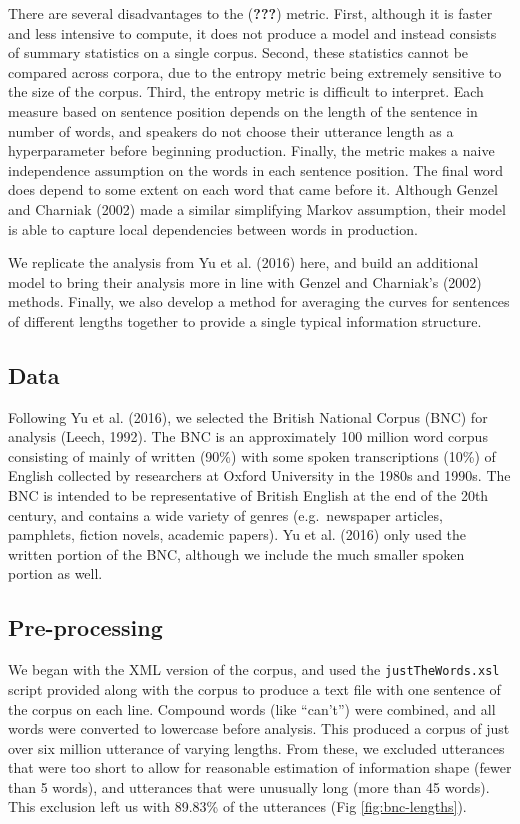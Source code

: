 \documentclass[
  english,
  man,floatsintext]{apa6}
\begin{document}
There are several disadvantages to the ({\textbf{???}}) metric. First, although it is faster and less intensive to compute, it does not produce a model and instead consists of summary statistics on a single corpus. Second, these statistics cannot be compared across corpora, due to the entropy metric being extremely sensitive to the size of the corpus. Third, the entropy metric is difficult to interpret. Each measure based on sentence position depends on the length of the sentence in number of words, and speakers do not choose their utterance length as a hyperparameter before beginning production. Finally, the metric makes a naive independence assumption on the words in each sentence position. The final word does depend to some extent on each word that came before it. Although Genzel and Charniak (2002) made a similar simplifying Markov assumption, their model is able to capture local dependencies between words in production.

We replicate the analysis from Yu et al. (2016) here, and build an additional model to bring their analysis more in line with Genzel and Charniak's (2002) methods. Finally, we also develop a method for averaging the curves for sentences of different lengths together to provide a single typical information structure.

\hypertarget{data}{%
\subsection{Data}\label{data}}

Following Yu et al. (2016), we selected the British National Corpus (BNC) for analysis (Leech, 1992). The BNC is an approximately 100 million word corpus consisting of mainly of written (90\%) with some spoken transcriptions (10\%) of English collected by researchers at Oxford University in the 1980s and 1990s. The BNC is intended to be representative of British English at the end of the 20th century, and contains a wide variety of genres (e.g.~newspaper articles, pamphlets, fiction novels, academic papers). Yu et al. (2016) only used the written portion of the BNC, although we include the much smaller spoken portion as well.

\hypertarget{pre-processing}{%
\subsection{Pre-processing}\label{pre-processing}}

We began with the XML version of the corpus, and used the \texttt{justTheWords.xsl} script provided along with the corpus to produce a text file with one sentence of the corpus on each line. Compound words (like ``can't'') were combined, and all words were converted to lowercase before analysis. This produced a corpus of just over six million utterance of varying lengths. From these, we excluded utterances that were too short to allow for reasonable estimation of information shape (fewer than 5 words), and utterances that were unusually long (more than 45 words). This exclusion left us with 89.83\% of the utterances (Fig \ref{fig:bnc-lengths}).
\end{document}
